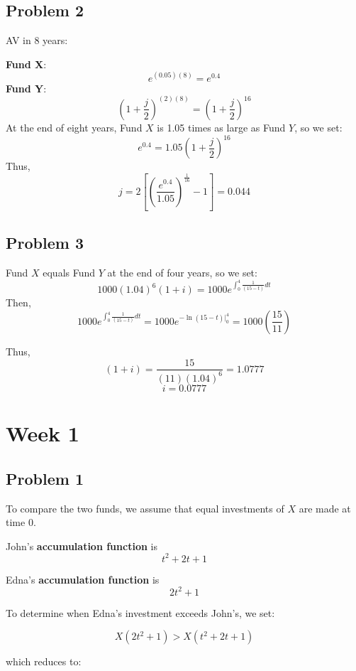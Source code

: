 \documentclass[
]{book}
\begin{document}
\hypertarget{problem-2}{%
\subsection*{Problem 2}\label{problem-2}}

AV in 8 years:

\textbf{Fund X}:\[e^{(0.05)(8)}=e^{0.4}\]
\textbf{Fund Y}:\[\left(1+\frac{j}{2}\right)^{(2)(8)}=\left(1+\frac{j}{2}\right)^{16}\]
At the end of eight years, Fund \(X\) is 1.05 times as large as Fund \(Y\), so we set:
\[e^{0.4}=1.05\left(1+\frac{j}{2}\right)^{16}\]
Thus,
\[j=2\left[\left(\frac{e^{0.4}}{1.05}\right)^{\frac{1}{16}}-1\right]=0.044\]

\hypertarget{problem-3}{%
\subsection*{Problem 3}\label{problem-3}}

Fund \(X\) equals Fund \(Y\) at the end of four years, so we set:
\[1000(1.04)^{6}(1+i)=1000e^{\int_{0}^{4} \frac{1}{(15-t)} dt}\]
Then,
\[1000e^{\int_{0}^{4} \frac{1}{(15-t)} dt}=1000e^{-\ln(15-t)|_{0}^{4}}=1000\left(\frac{15}{11}\right)\]

Thus,
\[(1+i)=\frac{15}{(11)(1.04)^6}=1.0777\]
\[i=0.0777\]

\hypertarget{week-1}{%
\section*{Week 1}\label{week-1}}

\hypertarget{problem-1-1}{%
\subsection*{Problem 1}\label{problem-1-1}}

To compare the two funds, we assume that equal investments of \(X\) are made at time 0.

John's \textbf{accumulation function} is \[t^2+2t+1\]

Edna's \textbf{accumulation function} is \[2t^{2}+1\]

To determine when Edna's investment exceeds John's, we set:

\[ X(2t^{2}+1)>X(t^{2}+2t+1)\]

which reduces to:
\end{document}
